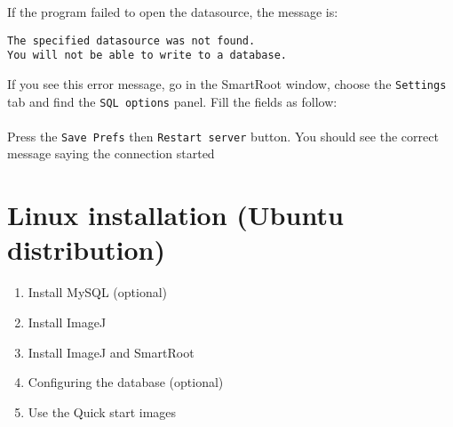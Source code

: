 \noindent If the program failed to open the datasource, the message is:

\begin{Verbatim}[frame=single, commandchars=+\(\)]
The specified datasource was not found.
You will not be able to write to a database.
\end{Verbatim}

\noindent
If you see this error message, go in the SmartRoot window, choose the \verb|Settings| tab and find the \verb|SQL options| panel. Fill the fields as follow:\\

\noindent
{}\\
	
\noindent Press the \verb|Save Prefs| then \verb|Restart server| button. You should see the correct message saying the connection started


\newpage
{\color{coolSection}\section[Linux installation]{Linux installation (Ubuntu distribution)}}

\begin{enumerate}
\item Install MySQL (optional)
\item Install ImageJ
\item Install ImageJ and SmartRoot
\item Configuring the database (optional)
\item Use the Quick start images
\end{enumerate}

%
%


